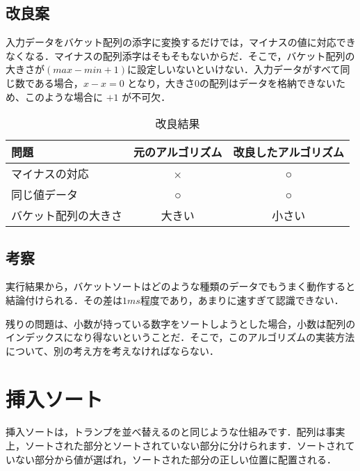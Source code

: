 \documentclass[a4j, titlepage]{jarticle}
\begin{document}
        \subsection{改良案}
            入力データをバケット配列の添字に変換するだけでは，マイナスの値に対応できなくなる．マイナスの配列添字はそもそもないからだ．そこで，バケット配列の大きさが$(max - min + 1)$に設定しいないといけない．入力データがすべて同じ数である場合，$ x - x = 0 $ となり，大きさ0の配列はデータを格納できないため、このような場合に $+ 1$ が不可欠．
            \begin{table}[tbh]
                \caption{改良結果}
                \label{tab:bucket_problem}
                \begin{center}
                    \begin{tabular}{|l|c|c|}
                        \hline
                        問題 & 元のアルゴリズム & 改良したアルゴリズム\\ \hline
                        マイナスの対応 & × & ○\\ \hline
                        同じ値データ & ○ & ○\\ \hline
                        バケット配列の大きさ & 大きい & 小さい\\ \hline
                    \end{tabular}
                \end{center}
            \end{table}

        \subsection{考察}
            実行結果から，バケットソートはどのような種類のデータでもうまく動作すると結論付けられる．その差は$1 ms$程度であり，あまりに速すぎて認識できない．

            残りの問題は、小数が持っている数字をソートしようとした場合，小数は配列のインデックスになり得ないということだ．そこで，このアルゴリズムの実装方法について、別の考え方を考えなければならない．


    \section{挿入ソート}
        挿入ソートは，トランプを並べ替えるのと同じような仕組みです．配列は事実上，ソートされた部分とソートされていない部分に分けられます．ソートされていない部分から値が選ばれ，ソートされた部分の正しい位置に配置される．
\end{document}
